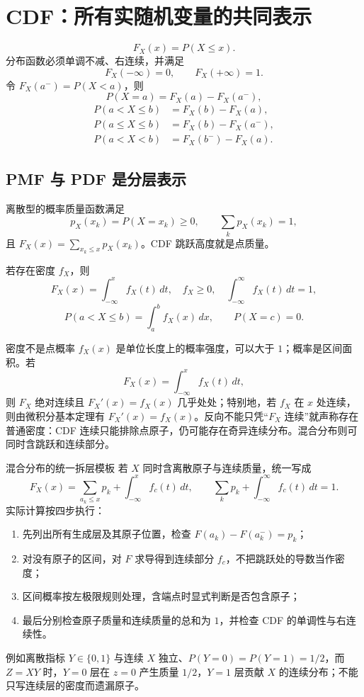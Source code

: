 \documentclass[11pt,a4paper]{ctexart}
\newenvironment{handbookdiagram}{\par\vspace{0.4em}\noindent\begin{center}}{\end{center}\vspace{0.4em}}
\begin{document}
\section{CDF：所有实随机变量的共同表示}
\[
\boxed{F_X(x)=P(X\le x)}.
\]
分布函数必须单调不减、右连续，并满足
\[
F_X(-\infty)=0,\qquad F_X(+\infty)=1.
\]
令 $F_X(a^-)=P(X<a)$，则
\[
P(X=a)=F_X(a)-F_X(a^-),
\]
\[
\begin{aligned}
P(a<X\le b)&=F_X(b)-F_X(a),\\
P(a\le X\le b)&=F_X(b)-F_X(a^-),\\
P(a<X<b)&=F_X(b^-)-F_X(a).
\end{aligned}
\]

\begin{handbookdiagram}
\resizebox{0.92\linewidth}{!}{%
%
}
\end{handbookdiagram}

\subsection{PMF 与 PDF 是分层表示}
离散型的概率质量函数满足
\[
p_X(x_k)=P(X=x_k)\ge0,\qquad \sum_kp_X(x_k)=1,
\]
且 $F_X(x)=\sum_{x_k\le x}p_X(x_k)$。CDF 跳跃高度就是点质量。

若存在密度 $f_X$，则
\[
F_X(x)=\int_{-\infty}^{x}f_X(t)\,dt,\quad f_X\ge0,\quad \int_{-\infty}^{\infty}f_X(t)\,dt=1,
\]
\[
P(a<X\le b)=\int_a^bf_X(x)\,dx,\qquad P(X=c)=0.
\]

\begin{warnbox}{密度不是点概率}
$f_X(x)$ 是单位长度上的概率强度，可以大于 $1$；概率是区间面积。若
\[
F_X(x)=\int_{-\infty}^{x}f_X(t)\,dt,
\]
则 $F_X$ 绝对连续且 $F_X'(x)=f_X(x)$ 几乎处处；特别地，若 $f_X$ 在 $x$ 处连续，则由微积分基本定理有 $F_X'(x)=f_X(x)$。反向不能只凭“$F_X$ 连续”就声称存在普通密度：CDF 连续只能排除点原子，仍可能存在奇异连续分布。混合分布则可同时含跳跃和连续部分。
\end{warnbox}

\begin{methodbox}{混合分布的统一拆层模板}
若 $X$ 同时含离散原子与连续质量，统一写成
\[
F_X(x)=\sum_{a_k\le x}p_k+\int_{-\infty}^{x}f_c(t)\,dt,
\qquad
\sum_kp_k+\int_{-\infty}^{\infty}f_c(t)\,dt=1.
\]
实际计算按四步执行：
\begin{enumerate}
  \item 先列出所有生成层及其原子位置，检查 $F(a_k)-F(a_k^-)=p_k$；
  \item 对没有原子的区间，对 $F$ 求导得到连续部分 $f_c$，不把跳跃处的导数当作密度；
  \item 区间概率按左极限规则处理，含端点时显式判断是否包含原子；
  \item 最后分别检查原子质量和连续质量的总和为 $1$，并检查 CDF 的单调性与右连续性。
\end{enumerate}
例如离散指标 $Y\in\{0,1\}$ 与连续 $X$ 独立、$P(Y=0)=P(Y=1)=1/2$，而 $Z=XY$ 时，$Y=0$ 层在 $z=0$ 产生质量 $1/2$，$Y=1$ 层贡献 $X$ 的连续分布；不能只写连续层的密度而遗漏原子。
\end{methodbox}
\end{document}
